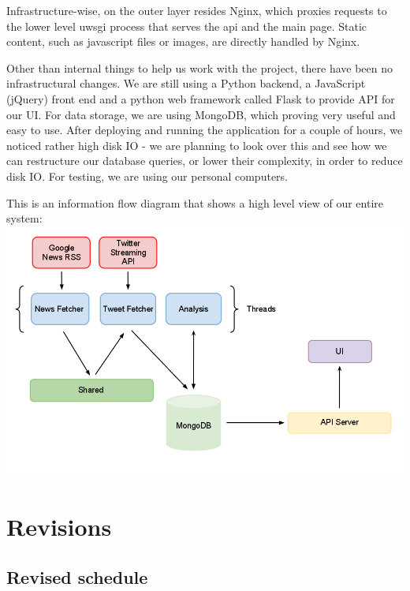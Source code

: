 \documentclass[a4paper,12pt]{article}
\begin{document}
	Infrastructure-wise, on the outer layer resides Nginx, which proxies requests to the lower level uwsgi process that serves the api and the main page. Static content, such as javascript files or images, are directly handled by Nginx.
	
	  Other than internal things to help us work with the project, there have been no infrastructural changes. We are still using a Python backend, a JavaScript (jQuery) front end and a python web framework called Flask to provide API for our UI. For data storage, we are using MongoDB, which proving very useful and easy to use. After deploying and running the application for a couple of hours, we noticed rather high disk IO - we are planning to look over this and see how we can restructure our database queries, or lower their complexity, in order to reduce disk IO. For testing, we are using our personal computers.
	  
	  This is an information flow diagram that shows a high level view of our entire system:
	  \includegraphics[scale=0.5]{infrastructure.png}
	
	\section{Revisions}
	
	\subsection{Revised schedule}
	
\end{document}
